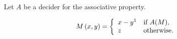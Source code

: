 \begin{frame}[plain]

\begin{center}
Let $A$ be a decider for the associative property.
\end{center}

\[M\left(x,y\right)=\left\{
\begin{array}{ll}
x-y\footnotemark & \text{if}\ A(M),\\
z & \text{otherwise}.
\end{array}
\right.\]


\end{frame}

